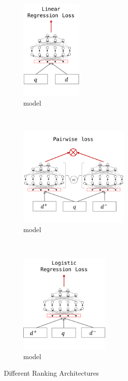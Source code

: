 \label{sec:models}
\begin{figure}[t]
    \centering
    \begin{subfigure}[t]{0.26\columnwidth}
        \centering
        \includegraphics[height=5cm]{03-part-02/chapter-04/figs_and_tables/fig_model_1.png}%
        \caption{\label{fig:m1}\mone model}
    \end{subfigure}%
    ~
    \begin{subfigure}[t]{0.40\columnwidth}
        \centering
        \includegraphics[height=5cm]{03-part-02/chapter-04/figs_and_tables/fig_model_2.png}%
        \caption{\label{fig:m2}\mtwo model}
    \end{subfigure}%
    ~
    \begin{subfigure}[t]{0.37\columnwidth}
        \centering
        \includegraphics[height=5cm]{03-part-02/chapter-04/figs_and_tables/fig_model_3.png}%
        \caption{\label{fig:m3}\mthree model}
    \end{subfigure}%
    \caption{\label{fig:ranking-arch} Different Ranking Architectures}
\end{figure}
%

